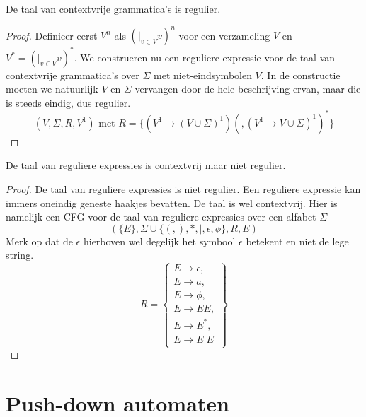 \documentclass[main.tex]{subfiles}
\begin{document}
\begin{st}
  De taal van contextvrije grammatica's is regulier.

  \begin{proof}
    Definieer eerst $V^{n}$ als $(|_{v \in V}v)^{n}$ voor een verzameling $V$ en $V^{*} = (|_{v \in V}v)^{*}$.
    We construeren nu een reguliere expressie voor de taal van contextvrije grammatica's over $\Sigma$ met niet-eindsymbolen $V$.
    In de constructie moeten we natuurlijk $V$ en $\Sigma$ vervangen door de hele beschrijving ervan, maar die is steeds eindig, dus regulier.
    \[
    (V,\Sigma, R, V^{1}) \text{ met } R = \{ (V^{1} \rightarrow (V \cup \Sigma)^{1}) (,(V^{1} \rightarrow V \cup \Sigma)^{1})^{*} \}
    \]
  \end{proof}
\end{st}

\begin{st}
  De taal van reguliere expressies is contextvrij maar niet regulier.
  
  \begin{proof}
    De taal van reguliere expressies is niet regulier.
    Een reguliere expressie kan immers oneindig geneste haakjes bevatten.
    De taal is wel contextvrij.
    Hier is namelijk een CFG voor de taal van reguliere expressies over een alfabet $\Sigma$
    \[ (\{E\},\Sigma\cup \{(,),*,|,\epsilon,\phi\},R,E)\]
    Merk op dat de $\epsilon$ hierboven wel degelijk het symbool $\epsilon$ betekent en niet de lege string.
    \[ R =
    \left\{ 
      \begin{array}{l}
        E \rightarrow \epsilon,\\
        E \rightarrow a,\\
        E \rightarrow \phi,\\
        E \rightarrow EE,\\
        E \rightarrow E^{*},\\
        E \rightarrow E|E
      \end{array}
    \right\}
    \]
    \end{proof}
\end{st}

\section{Push-down automaten}
\label{sec:push-down-automaten}
\end{document}
